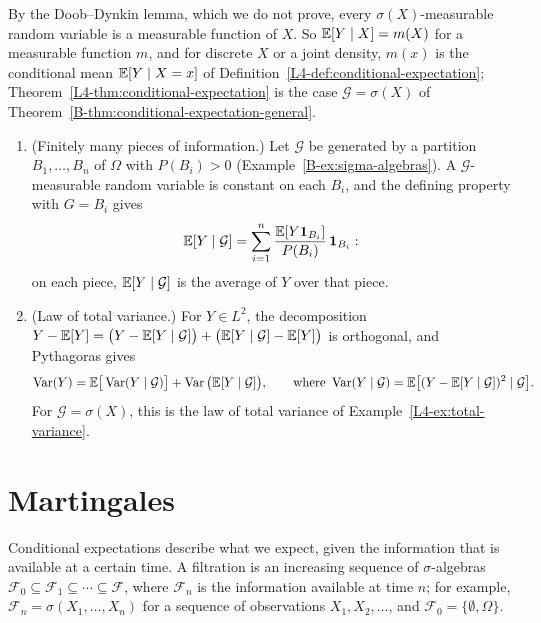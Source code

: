 By the Doob--Dynkin lemma, which we do not prove, every $\sigma(X)$-measurable random variable is a measurable function of $X$. So $\mathbb{E}[Y \mid X] = m(X)$ for a measurable function $m$, and for discrete $X$ or a joint density, $m(x)$ is the conditional mean $\mathbb{E}[Y \mid X = x]$ of Definition~\ref{L4-def:conditional-expectation}; Theorem~\ref{L4-thm:conditional-expectation} is the case $\mathcal{G} = \sigma(X)$ of Theorem~\ref{B-thm:conditional-expectation-general}.

\begin{example}\label{B-ex:conditional-partition}
    \begin{enumerate}
        \item (Finitely many pieces of information.) Let $\mathcal{G}$ be generated by a partition $B_1, \ldots, B_n$ of $\Omega$ with $P(B_i) > 0$ (Example~\ref{B-ex:sigma-algebras}). A $\mathcal{G}$-measurable random variable is constant on each $B_i$, and the defining property with $G = B_i$ gives
        \[\mathbb{E}[Y \mid \mathcal{G}] = \sum_{i=1}^n \frac{\mathbb{E}[Y\mathbf{1}_{B_i}]}{P(B_i)}\,\mathbf{1}_{B_i}:\]
        on each piece, $\mathbb{E}[Y \mid \mathcal{G}]$ is the average of $Y$ over that piece.
        \item (Law of total variance.) For $Y \in L^2$, the decomposition $Y - \mathbb{E}[Y] = \big(Y - \mathbb{E}[Y \mid \mathcal{G}]\big) + \big(\mathbb{E}[Y \mid \mathcal{G}] - \mathbb{E}[Y]\big)$ is orthogonal, and Pythagoras gives
        \[\operatorname{Var}(Y) = \mathbb{E}\big[\operatorname{Var}(Y \mid \mathcal{G})\big] + \operatorname{Var}\big(\mathbb{E}[Y \mid \mathcal{G}]\big), \qquad \text{where } \operatorname{Var}(Y \mid \mathcal{G}) = \mathbb{E}\big[(Y - \mathbb{E}[Y \mid \mathcal{G}])^2 \mid \mathcal{G}\big].\]
        For $\mathcal{G} = \sigma(X)$, this is the law of total variance of Example~\ref{L4-ex:total-variance}.
    \end{enumerate}
\end{example}

\section{Martingales}\label{B-sec:martingales}

Conditional expectations describe what we expect, given the information that is available at a certain time. A filtration is an increasing sequence of $\sigma$-algebras $\mathcal{F}_0 \subseteq \mathcal{F}_1 \subseteq \cdots \subseteq \mathcal{F}$, where $\mathcal{F}_n$ is the information available at time $n$; for example, $\mathcal{F}_n = \sigma(X_1, \ldots, X_n)$ for a sequence of observations $X_1, X_2, \ldots$, and $\mathcal{F}_0 = \{\emptyset, \Omega\}$.

